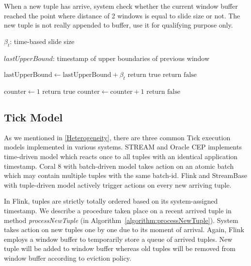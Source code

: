 \begin{algorithm}
\caption{Whether system should trigger a new window }
\label{algorithm:notifyTrigger}
When a new tuple has arrive, system check whether the current window buffer reached the point where distance of 2 windows is equal to slide size or not. The new tuple is not really appended to buffer, use it for qualifying purpose only.

\algrenewcommand{}
\begin{algorithmic}[1]
  	
  			{$\beta_t$: time-based slide size }

  			{$lastUpperBound$: timestamp of upper boundaries of previous window}
    
   
    
    			\State $\textrm{lastUpperBound} \gets \textrm{lastUpperBound} + \beta_t$
    			\State $\textrm{return true}$
    		\Else
    			\State$\textrm{return false}$
    		\EndIf
    
    \Else {}
    			\State $\textrm{counter} \gets 1$
    			\State $\textrm{return true}$
    		\Else
    			\State $\textrm{counter} \gets \textrm{counter} + 1$
    			\State $\textrm{return false}$
    		\EndIf
    	\EndIf
    
    
    \EndProcedure
  \end{algorithmic}
\end{algorithm}


\subsection{Tick Model}
As we mentioned in \ref{Heterogeneity}, there are three common Tick execution models\citep{Dindar:2013} implemented in various systems. STREAM and Oracle CEP implements time-driven model which reacts once to all tuples with an identical application timestamp. Coral 8 with batch-driven model takes action on an atomic batch which may contain multiple tuples with the same batch-id. Flink and StreamBase with tuple-driven model actively trigger actions on every new arriving tuple.

In Flink, tuples are strictly totally ordered based on its system-assigned timestamp. We describe a procedure taken place on a recent arrived tuple in method \textit{processNewTuple}  (in Algorithm~\ref{algorithm:processNewTuple}). 
System takes action on new tuples one by one due to its moment of arrival. 
Again, Flink employs a window buffer to temporarily store a queue of arrived tuples. New tuple will be added to window buffer whereas old tuples will be removed from window buffer according to eviction policy.

